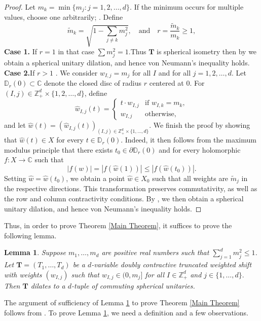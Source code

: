 \documentclass[12pt,reqno] {amsart}
\newtheorem{lemma}{Lemma}
\theoremstyle{remark}
\theoremstyle{definition}
\begin{document}
\begin{proof}
    Let $m_k = \min\{m_j : j = 1, 2, \ldots, d\}$. If the minimum occurs for multiple values, choose one arbitrarily; . Define
\[
\tilde{m}_k = \sqrt{1 - \sum_{j \neq k} m_j^2}, \quad \text{and} \quad r = \frac{\tilde{m}_k}{m_k}\geq 1,
\]
\textbf{Case 1.} If $r=1$ in that case $\sum m_j^2 =1$.Thus $\boldsymbol T$ is spherical isometry then by \cite{A.A} we obtain a spherical unitary dilation, and hence von Neumann's inequality holds.\\
\textbf{Case 2.}If $r>1$ .
We consider $w_{I,j} = m_j$ for all $I$ and for all $j = 1, 2, \ldots, d$. Let $\mathbb{D}_r(0) \subset \mathbb{C}$ denote the closed disc of radius $r$ centered at $0$. For $(I,j) \in \mathbb{Z}_+^d \times \{1, 2, \ldots, d\}$, define
\[
\hat{w}_{I,j}(t) = 
\begin{cases}
t \cdot w_{I,j} & \text{if } w_{I,k} = m_k, \\
w_{I,j} & \text{otherwise},
\end{cases}
\]
and let $\hat{w}(t) = (\hat{w}_{I,j}(t))_{(I,j)\in \mathbb{Z}_+^d \times \{1,\ldots,d\}}$.
We finish the proof by showing that $\hat{w}(t) \in X$ for every $t \in \mathbb{D}_r(0)$. Indeed, it then follows from the maximum modulus principle that there exists $t_0 \in \partial \mathbb{D}_r(0)$ and  for every holomorphic $f:X \to \mathbb{C}$ such that
\[
|f(w)| = |f(\hat{w}(1))| \leq |f(\hat{w}(t_0))|.
\]
Setting $\hat{w} = \hat{w}(t_0)$, we obtain a point $\hat{w} \in X_0$ such that all weights are $\tilde{m}_j$ in the respective directions. This transformation preserves commutativity, as well as the row and column contractivity conditions.
By \cite{A.A}, we then obtain a spherical unitary dilation, and hence von Neumann’s inequality holds. 
\end{proof}


Thus, in order to prove Theorem \ref{Main Theorem}, it suffices to prove the following lemma. 
\begin{lemma}\label{Sperical unitary dilation for truncated weighted shift}
Suppose $m_1,\ldots, m_d$ are positive real numbers such that \(\sum_{j=1}^d m_j^2 \leq1\).
Let $\boldsymbol T=(T_1,\ldots, T_d)$ be a \( d \)-variable doubly contractive truncated weighted shift with weights $(w_{I,j})$ such that \( w_{I,j}\in (0, m_j] \) for all $I\in\mathbb{Z}_+^d$ and $j\in\{1,\ldots, d\}.$ Then $\boldsymbol T$  dilates to a \( d \)-tuple of commuting spherical unitaries.
\end{lemma}

The argument of sufficiency of 
Lemma \ref{Sperical unitary dilation for truncated weighted shift}  to prove Theorem \ref{Main Theorem} follows from \cite[Lemma 4.1]{Hz}.
To prove Lemma \ref{Sperical unitary dilation for truncated weighted shift}, we need a definition and a few observations.
\end{document}
